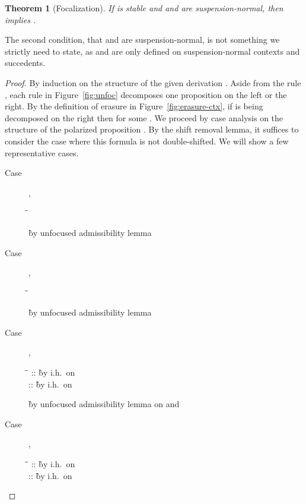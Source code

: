 \documentclass[acmtocl]{robtrans}\pdfoutput=1
\newtheorem{theorem}{Theorem}
\begin{document}
\begin{theorem}[Focalization]\label{thm:completeness}
If  is stable and  and  are suspension-normal, then
 implies .
\end{theorem}

\noindent
The second condition, that  and  are suspension-normal, is
not something we strictly need to state, as  and
 are only defined on suspension-normal contexts and
succedents.

\begin{proof}
By induction on the structure of the given derivation . Aside from the rule , each rule in
Figure~\ref{fig:unfoc} decomposes one proposition  on the left or
the right. By the definition of erasure in
Figure~\ref{fig:erasure-ctx}, if  is being decomposed on the right
then  for some . We proceed by 
case analysis on the structure of the polarized proposition .
By
the shift removal lemma, it suffices to consider the case where this
formula is not double-shifted. We will show a few representative
cases.

\begin{description}
\item[Case] , \quad

\begin{tabbing}
\qquad \=  \= \kill
\>
 
  \` by unfocused admissibility lemma 
\end{tabbing}

\item[Case] , \quad

\begin{tabbing}
\qquad \=  \= \kill
\>
 
  \` by unfocused admissibility lemma 
\end{tabbing}

\item[Case] , \quad

\begin{tabbing}
\qquad \=  \= \kill
\>
 \> :: 
  \` by i.h.~on \\
\>
 \> :: 
  \` by i.h.~on \\
\>
 
  \` by unfocused admissibility lemma  
     on  and 
\end{tabbing}

\item[Case] , \quad

\begin{tabbing}
\qquad \=  \= \kill
\>
 \> :: 
  \` by i.h.~on \\
\>
 \> :: 
  \` by i.h.~on \\
\>
 

\end{tabbing}
\end{description}
\end{proof}
\end{document}

